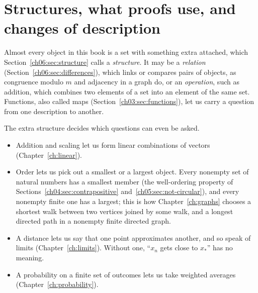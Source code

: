 \section{Structures, what proofs use, and changes of description}\label{appE:sec:structures}
Almost every object in this book is a set with something extra attached, which Section~\ref{ch06:sec:structure} calls a \emph{structure}. It may be a \emph{relation} (Section~\ref{ch06:sec:differences}), which links or compares pairs of objects, as congruence modulo $m$ and adjacency in a graph do, or an \emph{operation}, such as addition, which combines two elements of a set into an element of the same set. Functions, also called maps (Section~\ref{ch03:sec:functions}), let us carry a question from one description to another.

The extra structure decides which questions can even be asked.
\begin{itemize}
\item Addition and scaling let us form linear combinations of vectors (Chapter~\ref{ch:linear}).
\item Order lets us pick out a smallest or a largest object. Every nonempty set of natural numbers has a smallest member (the well-ordering property of Sections~\ref{ch04:sec:contrapositive} and~\ref{ch05:sec:not-circular}), and every nonempty finite one has a largest; this is how Chapter~\ref{ch:graphs} chooses a shortest walk between two vertices joined by some walk, and a longest directed path in a nonempty finite directed graph.
\item A distance lets us say that one point approximates another, and so speak of limits (Chapter~\ref{ch:limits}). Without one, ``$x_n$ gets close to $x_*$'' has no meaning.
\item A probability on a finite set of outcomes lets us take weighted averages (Chapter~\ref{ch:probability}).
\end{itemize}

